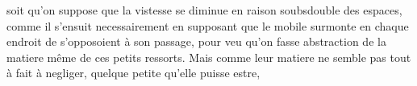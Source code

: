  soit qu'on suppose que la vistesse se diminue en raison soubsdouble des espaces, 
comme il s'ensuit necessairement en supposant que le mobile surmonte en chaque endroit de  s'opposoient \`{a} son passage, pour veu qu'on fasse abstraction de la matiere  m\^{e}me de ces petits ressorts. Mais comme leur matiere  ne semble pas tout \`{a} fait \`{a} negliger, quelque petite qu'elle puisse estre,%